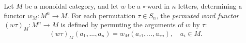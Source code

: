 Let $M$ be a monoidal category, and let $w$ be a $\square$-word in $n$ letters, determining a functor $w_M : M^n \to M$. For each permutation $\tau \in S_n$, the \emph{permuted word functor} $(w\tau)_M : M^n \to M$ is defined by permuting the arguments of $w$ by $\tau$:
$$(w\tau)_M(a_1, \ldots, a_n) = w_M(a_{\tau 1}, \ldots, a_{\tau n}), \quad a_i \in M.$$
